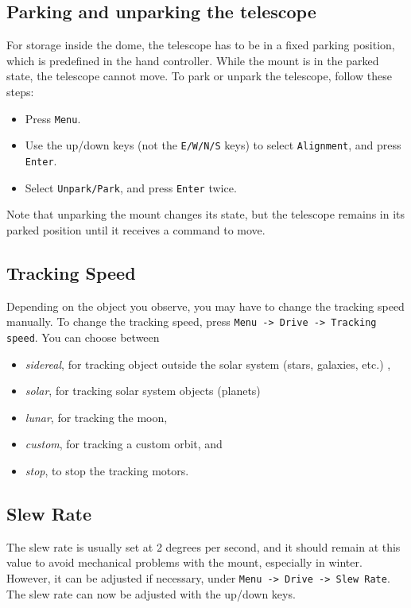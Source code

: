 \documentclass[a4paper, 11pt, fleqn]{memoir}
\begin{document}
\subsection{Parking and unparking the telescope}

For storage inside the dome, the telescope has to be in a fixed parking position, which is predefined in the hand controller.
While the mount is in the parked state, the telescope cannot move.
To park or unpark the telescope, follow these steps:

\begin{itemize}
    \item Press \texttt{Menu}.
    \item
          Use the up/down keys (not the \texttt{E/W/N/S} keys) to select \texttt{Alignment}, and press \texttt{Enter}.
    \item
          Select \texttt{Unpark/Park}, and press \texttt{Enter} twice.
\end{itemize}

Note that unparking the mount changes its state, but the telescope remains in its parked position until it receives a command to move.

\subsection{Tracking Speed}

Depending on the object you observe, you may have to change the tracking speed manually.
To change the tracking speed, press \texttt{Menu -> Drive -> Tracking speed}.
You can choose between
\begin{itemize}
    \item \emph{sidereal}, for tracking object outside the solar system (stars, galaxies, etc.)
          ,
    \item
          \emph{solar}, for tracking solar system objects (planets)
    \item
          \emph{lunar}, for tracking the moon,
    \item
          \emph{custom}, for tracking a custom orbit, and
    \item
          \emph{stop}, to stop the tracking motors.
\end{itemize}

\subsection{Slew Rate}

The slew rate is usually set at 2 degrees per second, and it should remain at this value to avoid mechanical problems with the mount, especially in winter.
However, it can be adjusted if necessary, under \texttt{Menu -> Drive -> Slew Rate}.
The slew rate can now be adjusted with the up/down keys.
\end{document}
